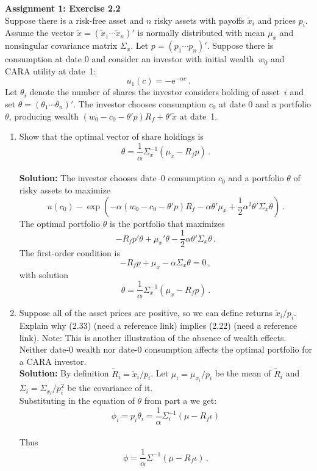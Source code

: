 \documentclass[11pt]{article}
\newcommand{\E}{\mathrm{e}}
\newcommand{\sol}{\textbf{Solution:} \hspace{2ex}}
\theoremstyle{definition}
\begin{document}
\begin{enumerate}
%
%
\newpage \noindent \textbf{Assignment 1: Exercise 2.2}\\
\noindent 
	Suppose there is a risk-free asset and $n$ risky assets with payoffs $\tilde{x}_i$ and prices $p_i$.  Assume the vector $\tilde{x}=(\tilde{x}_1 \cdots \tilde{x}_n)'$ is normally distributed with mean $\mu_x$ and nonsingular covariance matrix $\Sigma_x$.  Let $p=(p_1 \cdots p_n)'$.  Suppose there is consumption at date 0 and consider an investor with initial wealth~$w_0$ and CARA utility at date~1:
	$$u_1(c) = - \E^{-\alpha c}\,.$$
	Let $\theta_i$ denote the number of shares the investor considers holding of asset~$i$ and set $\theta = (\theta_1 \cdots \theta_n)'$.
	The investor chooses consumption $c_0$ at date 0 and a portfolio $\theta$, producing wealth $(w_0-c_0 - \theta'p)R_f + \theta'\tilde{x}$ at date~1.
	\begin{enumerate}\renewcommand{\labelenumi}{(\alph{enumi})}
		\item Show that the optimal vector of share holdings is
		$$\theta = \frac{1}{\alpha }\Sigma_x^{-1}(\mu_x-R_fp)\,.$$\\
		\noindent\sol The investor chooses date--0 consumption $c_0$ and a portfolio $\theta$ of risky assets to maximize
		$$u(c_0) - \exp\left(-\alpha(w_0-c_0-\theta'p)R_f - \alpha \theta'\mu_x + \frac{1}{2}\alpha^2\theta'\Sigma_x\theta\right)\,.$$
		The optimal portfolio $\theta$ is the portfolio that maximizes
		$$ - R_fp'\theta +  \mu_x'\theta  - \frac{1}{2}\alpha\theta'\Sigma_x\theta\,.$$
		The first-order condition is
		$$-R_fp + \mu_x - \alpha\Sigma_x\theta = 0\,,$$
		with solution
		$$\theta = \frac{1}{\alpha}\Sigma_x^{-1}(\mu_x-R_fp)\,.$$
		\item Suppose all of the asset prices are positive, so we can define returns $\tilde{x}_i/p_i$. Explain why (2.33) (need a reference link) implies (2.22) (need a reference link). Note: This is another illustration of the absence of wealth effects. Neither date-0 wealth nor date-0 consumption affects the optimal portfolio for a CARA investor.\\
		\noindent\sol By definition $\tilde{R}_i=\tilde{x}_i/p_i$. Let $\mu_i=\mu_{x_i}/p_i$ be the mean of $\tilde{R}_i$ and $\Sigma_i=\Sigma_{x_i}/p_i^2$ be the covariance of it.\\
		Substituting in the equation of $\theta$ from part a we get:\\
		$$\phi_i=p_i\theta_i=\frac{1}{\alpha}\Sigma^{-1}_i(\mu-R_f\iota)$$\\
		Thus\\
		$$\phi=\frac{1}{\alpha}\Sigma^{-1}(\mu-R_f\iota)\,.$$
	

\end{enumerate}
\end{enumerate}
\end{document}
